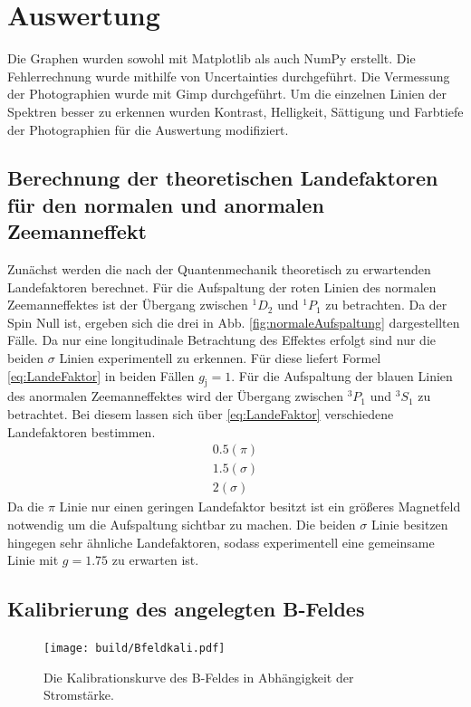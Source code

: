 \section{Auswertung}
\label{sec:Auswertung}
Die Graphen wurden sowohl mit Matplotlib \cite{matplotlib} als auch NumPy \cite{numpy} erstellt. Die
Fehlerrechnung wurde mithilfe von Uncertainties \cite{uncertainties} durchgeführt. Die Vermessung der Photographien wurde mit Gimp durchgeführt. Um die einzelnen Linien der Spektren besser zu erkennen wurden Kontrast, Helligkeit, Sättigung und Farbtiefe der Photographien für die Auswertung modifiziert.%



\subsection{Berechnung der theoretischen Landefaktoren für den normalen und anormalen Zeemanneffekt}
Zunächst werden die nach der Quantenmechanik theoretisch zu erwartenden Landefaktoren berechnet. Für die Aufspaltung der roten Linien des normalen Zeemanneffektes ist der Übergang zwischen $^1 D_2$ und $^1 P_1$ zu betrachten.
 Da der Spin Null ist, ergeben sich die drei in Abb. \ref{fig:normaleAufspaltung} dargestellten Fälle. Da nur eine longitudinale Betrachtung des Effektes erfolgt sind nur die beiden $\sigma$ Linien experimentell zu erkennen. Für diese liefert Formel \eqref{eq:LandeFaktor} in beiden Fällen $g_\text{j} = 1$.
Für die Aufspaltung der blauen Linien des anormalen Zeemanneffektes wird der Übergang zwischen $^3 P_1$ und $^3 S_1$ zu betrachtet. Bei diesem lassen sich über \eqref{eq:LandeFaktor} verschiedene Landefaktoren bestimmen. 
\begin{gather}
	0.5 (\pi)\\
	1.5 (\sigma)\\
	2 (\sigma)
\end{gather}
Da die $\pi$ Linie nur einen geringen Landefaktor besitzt ist ein größeres Magnetfeld notwendig um die Aufspaltung sichtbar zu machen. Die beiden $\sigma$ Linie besitzen hingegen sehr ähnliche Landefaktoren, sodass experimentell eine gemeinsame Linie mit $g= 1.75$ zu erwarten ist.

\subsection{Kalibrierung des angelegten B-Feldes}

\begin{figure}
	\centering
	\texttt{[image: build/Bfeldkali.pdf]}
	\caption{Die Kalibrationskurve des B-Feldes in Abhängigkeit der Stromstärke.}
	\label{fig:BvonI}
\end{figure}


